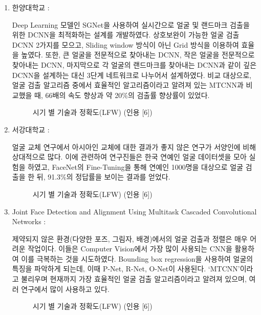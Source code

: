 \documentclass{oblivoir}
\begin{document}
\begin{enumerate}%
    \item 한양대학교 :

    Deep Learning 모델인 SGNet을 사용하여 실시간으로 얼굴 및 랜드마크 검출을 위한 DCNN을 최적화하는 설계를 개발하였다. 
    상호보완이 가능한 얼굴 검출 DCNN 2가지를 모으고, Sliding window 방식이 아닌 Grid 방식을 이용하여 효율을 높였다. 
    또한, 큰 얼굴을 전문적으로 찾아내는 DCNN, 작은 얼굴을 전문적으로 찾아내는 DCNN, 마지막으로 각 얼굴의 랜드마크를 찾아내는 DCNN과
    같이 깊은 DCNN을 설계하는 대신 3단계 네트워크로 나누어서 설계하였다. 비교 대상으로, 
    얼굴 검출 알고리즘 중에서 효율적인 알고리즘이라고 알려져 있는 MTCNN과 비교했을 때, 66배의 속도 향상과 약 20\%의 검출률 향상률이 있었다.

    \begin{figure}[h!]
        \centering
        \caption{시기 별 기술과 정확도(LFW) (인용 [6])    }
    \end{figure}

    \item 서강대학교 : 

    얼굴 교체 연구에서 아시아인 교체에 대한 결과가 좋지 않은 연구가 서양인에 비해 상대적으로 많다.
    이에 관련하여 연구진들은 한국 연예인 얼굴 데이터셋을 모아 실험을 하였고, 
    FaceNet의 Fine-Tuning을 통해 연예인 1000명을 대상으로 얼굴 검출을 한 뒤, 
    91.3\%의 정답률을 보이는 결과를 얻었다.

    \begin{figure}[h!]
        \centering
        \caption{시기 별 기술과 정확도(LFW) (인용 [6])    }
    \end{figure}

    \item Joint Face Detection and Alignment Using Multitask Cascaded Convolutional Networks : 

    제약되지 않은 환경(다양한 포즈, 그림자, 배경)에서의 얼굴 검출과 정렬은 매우 어려운 작업이다. 
    이들은 Computer Vision에서 가장 많이 사용되는 CNN을 활용하여 이를 극복하는 것을 시도하였다.
    Bounding box regression을 사용하여 얼굴의 특징을 파악하게 되는데, 이때 P-Net, R-Net, O-Net이 사용된다.
    ‘MTCNN’이라고 불리우며 현재까지 가장 효율적인 얼굴 검출 알고리즘이라고 알려져 있으며, 여러 연구에서 많이 사용하고 있다. 

    \begin{figure}[h!]
        \centering
        \caption{ 시기 별 기술과 정확도(LFW) (인용 [6])    }
    \end{figure}


\end{enumerate}
\end{document}

